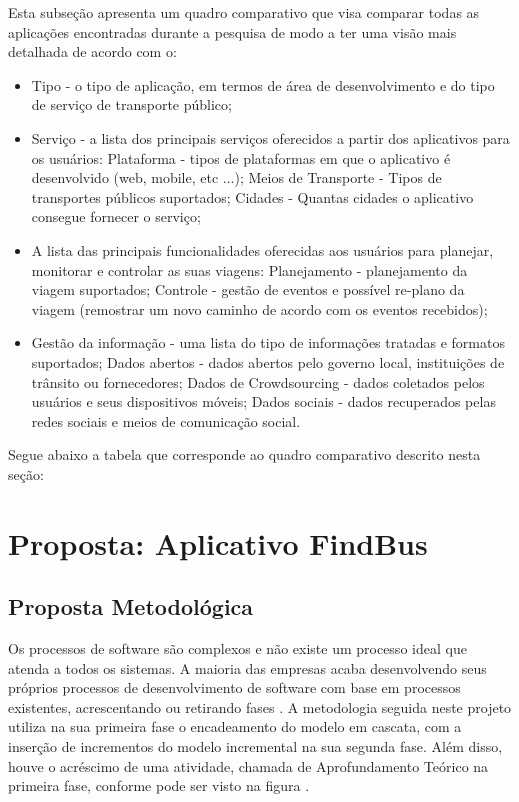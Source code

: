 Esta subseção apresenta um quadro comparativo que visa comparar todas as aplicações encontradas durante a pesquisa de modo a ter uma visão mais detalhada de acordo com o:

\begin{itemize}
\item Tipo - o tipo de aplicação, em termos de área de desenvolvimento e do tipo de serviço de transporte público;
\item Serviço - a lista dos principais serviços oferecidos a partir dos aplicativos para os usuários:
\subitem Plataforma - tipos de plataformas em que o aplicativo é desenvolvido (web, mobile, etc ...);
\subitem Meios de Transporte -  Tipos de transportes públicos suportados;
\subitem Cidades -  Quantas cidades o aplicativo consegue fornecer o serviço;
\item A lista das principais funcionalidades oferecidas aos usuários para planejar, monitorar e controlar as suas viagens:
\subitem Planejamento - planejamento da viagem suportados;
\subitem Controle - gestão de eventos e possível re-plano da viagem (remostrar um novo caminho de acordo com os eventos recebidos);  
\item Gestão da informação - uma lista do tipo de informações tratadas e formatos suportados;
\subitem Dados abertos - dados abertos pelo governo local, instituições de trânsito ou fornecedores;
\subitem Dados de Crowdsourcing - dados coletados pelos usuários e seus dispositivos móveis; 
\subitem Dados sociais - dados recuperados pelas redes sociais e meios de comunicação social.
\end{itemize}

Segue abaixo a tabela que corresponde ao quadro comparativo descrito nesta seção:


\chapter{Proposta: Aplicativo FindBus}
\label{ch:finsbus}

\section{Proposta Metodológica}
\label{sc:propostaMetodologica}

Os processos de software são complexos e não existe um processo ideal que atenda a todos os sistemas. A maioria das empresas acaba desenvolvendo seus próprios processos de desenvolvimento de software com base em processos existentes, acrescentando ou retirando fases \citep{SOMMERVILLE2011}. A metodologia seguida neste projeto utiliza na sua primeira fase o encadeamento do modelo em cascata, com a inserção de incrementos do modelo incremental na sua segunda fase. Além disso, houve o acréscimo de uma atividade, chamada de Aprofundamento Teórico na primeira fase, conforme pode ser visto na figura .

